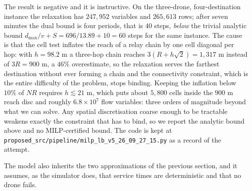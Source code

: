 \documentclass[11pt]{article}
\begin{document}
The result is negative and it is instructive. On the three-drone, four-destination instance the
relaxation has $247{,}952$ variables and $265{,}613$ rows; after seven minutes the dual bound is
four periods, that is $40$ steps, \emph{below} the trivial analytic bound
$d_{\max}/v + S = 696/13.89 + 10 = 60$ steps for the same instance. The cause is that the cell
test inflates the reach of a relay chain by one cell diagonal per hop: with $h = 98.2$ m a
three-hop chain reaches $3(R + h\sqrt{2}) = 1{,}317$ m instead of $3R = 900$ m, a $46\%$
overestimate, so the relaxation serves the farthest destination without ever forming a chain and
the connectivity constraint, which is the entire difficulty of the problem, stops binding.
Keeping the inflation below $10\%$ of $NR$ requires $h \lesssim 21$ m, which puts about
$5{,}800$ cells inside the $900$ m reach disc and roughly $6.8 \times 10^{7}$ flow variables:
three orders of magnitude beyond what we can solve. Any spatial discretisation coarse enough to
be tractable weakens exactly the constraint that has to bind, so we report the analytic bound
above and no MILP-certified bound. The code is kept at
\texttt{proposed\_src/pipeline/milp\_lb\_v5\_26\_09\_27\_15.py} as a record of the attempt.

The model also inherits the two approximations of the previous section, and it assumes, as the
simulator does, that service times are deterministic and that no drone fails.
\end{document}
